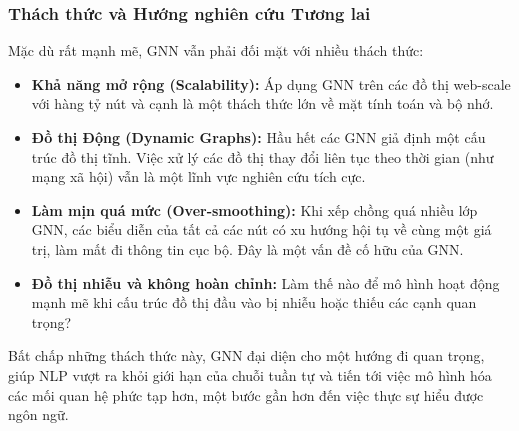 \subsubsection{Thách thức và Hướng nghiên cứu Tương lai}
\label{ssec:gnn_challenges}
Mặc dù rất mạnh mẽ, GNN vẫn phải đối mặt với nhiều thách thức:
\begin{itemize}
    \item \textbf{Khả năng mở rộng (Scalability):} Áp dụng GNN trên các đồ thị web-scale với hàng tỷ nút và cạnh là một thách thức lớn về mặt tính toán và bộ nhớ.
    \item \textbf{Đồ thị Động (Dynamic Graphs):} Hầu hết các GNN giả định một cấu trúc đồ thị tĩnh. Việc xử lý các đồ thị thay đổi liên tục theo thời gian (như mạng xã hội) vẫn là một lĩnh vực nghiên cứu tích cực.
    \item \textbf{Làm mịn quá mức (Over-smoothing):} Khi xếp chồng quá nhiều lớp GNN, các biểu diễn của tất cả các nút có xu hướng hội tụ về cùng một giá trị, làm mất đi thông tin cục bộ. Đây là một vấn đề cố hữu của GNN.
    \item \textbf{Đồ thị nhiễu và không hoàn chỉnh:} Làm thế nào để mô hình hoạt động mạnh mẽ khi cấu trúc đồ thị đầu vào bị nhiễu hoặc thiếu các cạnh quan trọng?
\end{itemize}

Bất chấp những thách thức này, GNN đại diện cho một hướng đi quan trọng, giúp NLP vượt ra khỏi giới hạn của chuỗi tuần tự và tiến tới việc mô hình hóa các mối quan hệ phức tạp hơn, một bước gần hơn đến việc thực sự hiểu được ngôn ngữ.